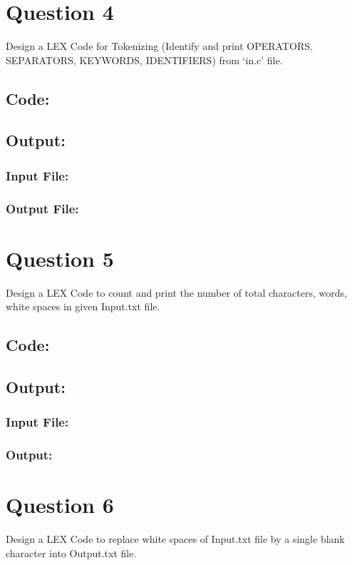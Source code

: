 \documentclass{article}
\begin{document}
\newpage
\section*{Question 4}
Design a LEX Code for Tokenizing
(Identify and print OPERATORS, SEPARATORS, KEYWORDS,
IDENTIFIERS)  from `in.c' file.
\subsection*{Code:}

\newpage
\subsection*{Output:}
\subsubsection*{Input File:}

\subsubsection*{Output File:}


\newpage
\section*{Question 5}
Design a LEX Code to count and print the number of total
characters, words, white spaces in given Input.txt file.
\subsection*{Code:}

\subsection*{Output:}
\subsubsection*{Input File:}

\subsubsection*{Output:}


\newpage
\section*{Question 6}
Design a LEX Code to replace white spaces of Input.txt
file by a single blank character into Output.txt file.
\end{document}
